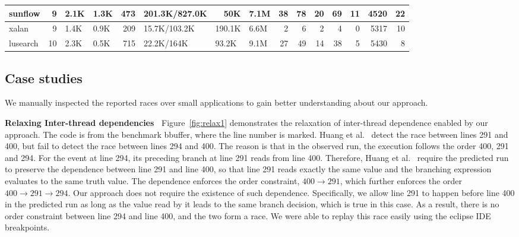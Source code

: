\begin{table}[htbp]
\begin{flushleft}
\begin{tabular}{|l|r|r|r|r|l|r|r|r|r|r|r|r|r|r|}
sunflow & 9 & \multicolumn{1}{l|}{2.1K} & \multicolumn{1}{l|}{1.3K} & 473 & 201.3K/827.0K & 50K & \multicolumn{1}{l|}{7.1M} & 38 & 78 & 20 & 69 & 11 & 4520 & 22 \\ \hline
xalan & 9 & \multicolumn{1}{l|}{1.4K} & \multicolumn{1}{l|}{0.9K} & 209 & 15.7K/103.2K & \multicolumn{1}{l|}{190.1K} & \multicolumn{1}{l|}{6.6M} & 2 & 6 & 2 & 4 & 0 & 5317 & 10 \\ \hline
lusearch & 10 & \multicolumn{1}{l|}{2.3K} & \multicolumn{1}{l|}{0.5K} & 715 & 22.2K/164K & \multicolumn{1}{l|}{93.2K} & \multicolumn{1}{l|}{9.1M} & 27 & 49 & 14 & 38 & 5 & 5430 & 8 \\ \hline
\end{tabular}
\end{flushleft}
\label{tab:main}
\end{table}









  



\subsection{Case studies}
We manually inspected the reported races over small applications to gain better understanding about our approach. 

{\bf Relaxing Inter-thread dependencies\ } Figure~\ref{fig:relax1} demonstrates the relaxation of inter-thread dependence enabled by our approach. 
The code is from the benchmark {\sf bbuffer}, where the line number is marked. Huang et al.~\cite{} detect the race between lines 291 and 400, but fail to detect the race between lines 294 and 400. The reason is that in the observed run, the execution follows the order 400, 291 and 294. For the event at line 294, its preceding branch at line 291 reads from line 400. Therefore, Huang et al.~\cite{}
 require the predicted run to preserve the dependence between line 291 and line 400, so that line 291 reads exactly the same value and the branching expression evaluates to the same truth value. The dependence enforces the order constraint, $400 \rightarrow 291$, which further enforces the order $400\rightarrow 291 \rightarrow 294$.    Our approach does not require the existence of such dependence. Specifically, we allow line 291 to happen before line 400 in the predicted run as long as the value read by it leads to the same branch decision, which is true in this case.  As a result, there is no order constraint between line 294 and line 400, and the two form a race. We were able to replay this race  easily using the eclipse IDE breakpoints. 


